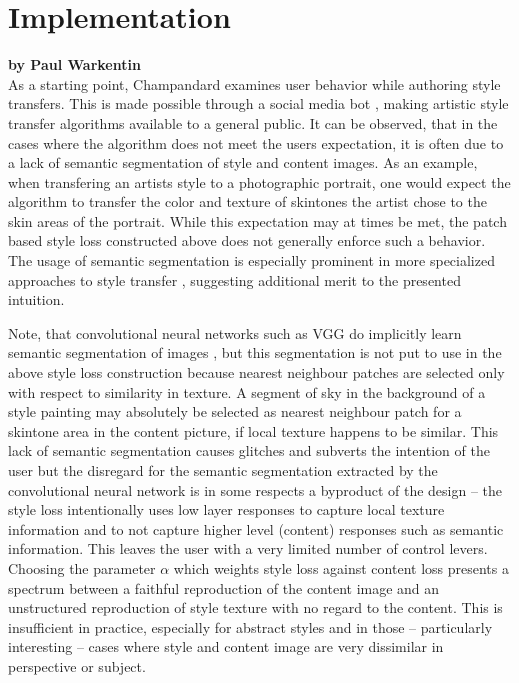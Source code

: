 
\section{Implementation}
\label{section:implementation}

\textbf{by Paul Warkentin} \\

As a starting point, Champandard examines user behavior while authoring style transfers. This is made possible through a social media bot \cite{deepforger2015}, making artistic style transfer algorithms available to a general public. It can be observed, that in the cases where the algorithm does not meet the users expectation, it is often due to a lack of semantic segmentation of style and content images. As an example, when transfering an artists style to a photographic portrait, one would expect the algorithm to transfer the color and texture of skintones the artist chose to the skin areas of the portrait. While this expectation may at times be met, the patch based style loss constructed above does not generally enforce such a behavior. The usage of semantic segmentation is especially prominent in more specialized approaches to style transfer \cite{yang2017semantic}, suggesting additional merit to the presented intuition.

Note, that convolutional neural networks such as VGG do implicitly learn semantic segmentation of images \cite{thoma2016survey}, but this segmentation is not put to use in the above style loss construction because nearest neighbour patches are selected only with respect to similarity in texture. A segment of sky in the background of a style painting may absolutely be selected as nearest neighbour patch for a skintone area in the content picture, if local texture happens to be similar. This lack of semantic segmentation causes glitches and subverts the intention of the user but the disregard for the semantic segmentation extracted by the convolutional neural network is in some respects a byproduct of the design -- the style loss intentionally uses low layer responses to capture local texture information and to not capture higher level (content) responses such as semantic information. This leaves the user with a very limited number of control levers. Choosing the parameter \(\alpha\) which weights style loss against content loss presents a spectrum between a faithful reproduction of the content image and an unstructured reproduction of style texture with no regard to the content. This is insufficient in practice, especially for abstract styles and in those -- particularly interesting -- cases where style and content image are very dissimilar in perspective or subject.

